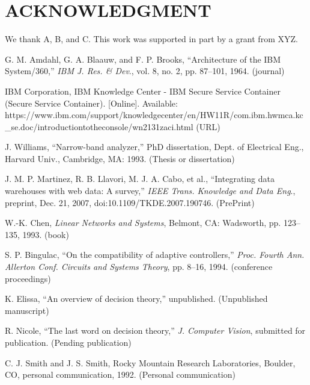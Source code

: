 \documentclass{IEEEcsmag}
\begin{document}
\section{ACKNOWLEDGMENT}

We thank A, B, and C. This work was supported in part by a grant from XYZ.


\begin{thebibliography}{1}

G. M. Amdahl, G. A. Blaauw, and F. P. Brooks, ``Architecture of the IBM System/360,'' {\it IBM J. Res. \& Dev}., vol. 8, no. 2, pp. 87--101, 1964. (journal)

IBM Corporation, IBM Knowledge Center - IBM Secure Service Container (Secure Service Container). [Online]. Available: {https://www.ibm.com/support/\break knowledgecenter/en/HW11R/com.ibm.hwmca.kc\_se.doc/\break introductiontotheconsole/wn2131zaci.html} (URL)

J. Williams, ``Narrow-band analyzer,'' PhD dissertation, Dept. of Electrical Eng., Harvard Univ., Cambridge, MA: 1993. (Thesis or dissertation)

J. M. P. Martinez, R. B. Llavori, M. J. A. Cabo, et al., ``Integrating data warehouses with web data: A survey,'' {\it IEEE Trans. Knowledge and Data Eng}., preprint, Dec. 21, 2007, doi:10.1109/TKDE.2007.190746. (PrePrint)

W.-K. Chen, {\it Linear Networks and Systems}, Belmont, CA: Wadsworth, pp. 123--135, 1993. (book)

S. P. Bingulac, ``On the compatibility of adaptive controllers,'' {\it Proc. Fourth Ann. Allerton Conf. Circuits and Systems Theory}, pp. 8--16, 1994. (conference proceedings)\vadjust{\vfill\pagebreak}

K. Elissa, ``An overview of decision theory,'' unpublished. (Unpublished manuscript)

R. Nicole, ``The last word on decision theory,'' {\it J. Computer Vision}, submitted for publication. (Pending publication)

C. J. Smith and J. S. Smith, Rocky Mountain Research Laboratories, Boulder, CO, personal communication, 1992. (Personal communication)
\end{thebibliography}
\end{document}
